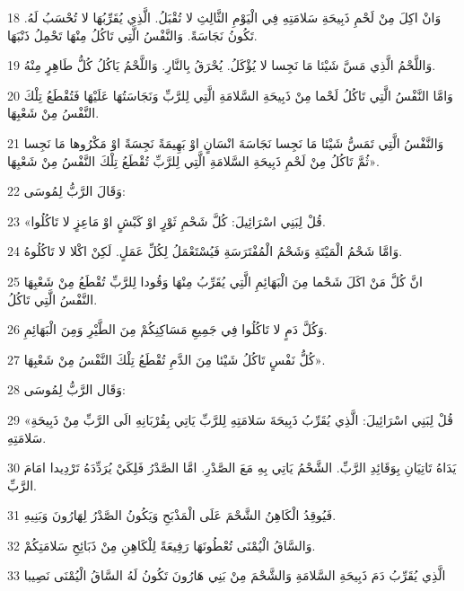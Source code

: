 \par 18 وَانْ اكِلَ مِنْ لَحْمِ ذَبِيحَةِ سَلامَتِهِ فِي الْيَوْمِ الثَّالِثِ لا تُقْبَلُ. الَّذِي يُقَرِّبُهَا لا تُحْسَبُ لَهُ. تَكُونُ نَجَاسَةً. وَالنَّفْسُ الَّتِي تَاكُلُ مِنْهَا تَحْمِلُ ذَنْبَهَا.
\par 19 وَاللَّحْمُ الَّذِي مَسَّ شَيْئا مَا نَجِسا لا يُؤْكَلُ. يُحْرَقُ بِالنَّارِ. وَاللَّحْمُ يَاكُلُ كُلُّ طَاهِرٍ مِنْهُ.
\par 20 وَامَّا النَّفْسُ الَّتِي تَاكُلُ لَحْما مِنْ ذَبِيحَةِ السَّلامَةِ الَّتِي لِلرَّبِّ وَنَجَاسَتُهَا عَلَيْهَا فَتُقْطَعُ تِلْكَ النَّفْسُ مِنْ شَعْبِهَا.
\par 21 وَالنَّفْسُ الَّتِي تَمَسُّ شَيْئا مَا نَجِسا نَجَاسَةَ انْسَانٍ اوْ بَهِيمَةً نَجِسَةً اوْ مَكْرُوها مَا نَجِسا ثُمَّ تَاكُلُ مِنْ لَحْمِ ذَبِيحَةِ السَّلامَةِ الَّتِي لِلرَّبِّ تُقْطَعُ تِلْكَ النَّفْسُ مِنْ شَعْبِهَا».
\par 22 وَقَالَ الرَّبُّ لِمُوسَى:
\par 23 «قُلْ لِبَنِي اسْرَائِيلَ: كُلَّ شَحْمِ ثَوْرٍ اوْ كَبْشٍ اوْ مَاعِزٍ لا تَاكُلُوا.
\par 24 وَامَّا شَحْمُ الْمَيْتَةِ وَشَحْمُ الْمُفْتَرَسَةِ فَيُسْتَعْمَلُ لِكُلِّ عَمَلٍ. لَكِنْ اكْلا لا تَاكُلُوهُ.
\par 25 انَّ كُلَّ مَنْ اكَلَ شَحْما مِنَ الْبَهَائِمِ الَّتِي يُقَرِّبُ مِنْهَا وَقُودا لِلرَّبِّ تُقْطَعُ مِنْ شَعْبِهَا النَّفْسُ الَّتِي تَاكُلُ.
\par 26 وَكُلَّ دَمٍ لا تَاكُلُوا فِي جَمِيعِ مَسَاكِنِكُمْ مِنَ الطَّيْرِ وَمِنَ الْبَهَائِمِ.
\par 27 كُلُّ نَفْسٍ تَاكُلُ شَيْئا مِنَ الدَّمِ تُقْطَعُ تِلْكَ النَّفْسُ مِنْ شَعْبِهَا».
\par 28 وَقَال الرَّبُّ لِمُوسَى:
\par 29 «قُلْ لِبَنِي اسْرَائِيلَ: الَّذِي يُقَرِّبُ ذَبِيحَةَ سَلامَتِهِ لِلرَّبِّ يَاتِي بِقُرْبَانِهِ الَى الرَّبِّ مِنْ ذَبِيحَةِ سَلامَتِهِ.
\par 30 يَدَاهُ تَاتِيَانِ بِوَقَائِدِ الرَّبِّ. الشَّحْمُ يَاتِي بِهِ مَعَ الصَّدْرِ. امَّا الصَّدْرُ فَلِكَيْ يُرَدِّدَهُ تَرْدِيدا امَامَ الرَّبِّ.
\par 31 فَيُوقِدُ الْكَاهِنُ الشَّحْمَ عَلَى الْمَذْبَحِ وَيَكُونُ الصَّدْرُ لِهَارُونَ وَبَنِيهِ.
\par 32 وَالسَّاقُ الْيُمْنَى تُعْطُونَهَا رَفِيعَةً لِلْكَاهِنِ مِنْ ذَبَائِحِ سَلامَتِكُمْ.
\par 33 الَّذِي يُقَرِّبُ دَمَ ذَبِيحَةِ السَّلامَةِ وَالشَّحْمَ مِنْ بَنِي هَارُونَ تَكُونُ لَهُ السَّاقُ الْيُمْنَى نَصِيبا
